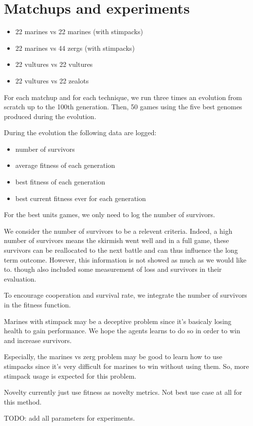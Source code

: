 \section{Matchups and experiments}

\begin{itemize}
    \item 22 marines vs 22 marines (with stimpacks)
    \item 22 marines vs 44 zergs (with stimpacks)
    \item 22 vultures vs 22 vultures
    \item 22 vultures vs 22 zealots
\end{itemize}

For each matchup and for each technique, we run three times an evolution from scratch up to the 100th generation.
Then, 50 games using the five best genomes produced during the evolution.

During the evolution the following data are logged:
\begin{itemize}
    \item number of survivors
    \item average fitness of each generation
    \item best fitness of each generation
    \item best current fitness ever for each generation
\end{itemize}

For the best units games, we only need to log the number of survivors.

We consider the number of survivors to be a relevent criteria. Indeed, a high number of survivors means the skirmish went well
and in a full game, these survivors can be reallocated to the next battle and can thus influence the long term outcome.
However, this information is not showed as much as we would like to. \citet{SiSuBa14} though also included some measurement of loss
and survivors in their evaluation.

To encourage cooperation and survival rate, we integrate the number of survivors in the fitness function.

Marines with stimpack may be a deceptive problem since it's basicaly losing health to gain performance.
We hope the agents learns to do so in order to win and increase survivors.

Especially, the marines vs zerg problem may be good to learn how to use stimpacks since it’s very difficult
for marines to win without using them. So, more stimpack usage is expected for this problem.

Novelty currently just use fitness as novelty metrics. Not best use case at all for this method.

TODO: add all parameters for experiments.

